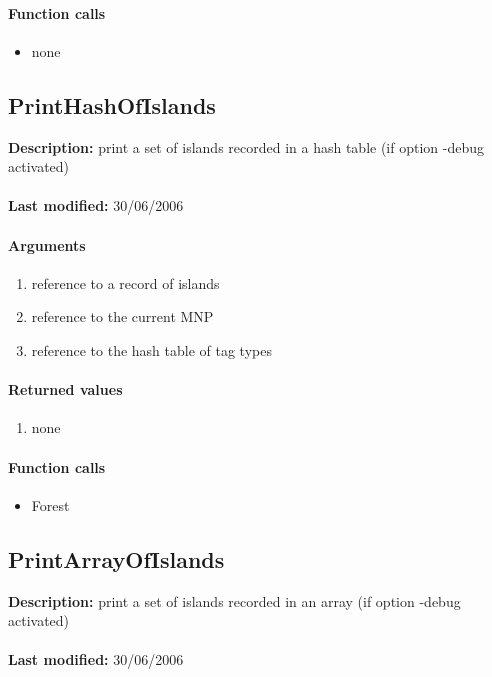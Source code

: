 \paragraph{Function calls}
\begin{itemize}
\item none
\end{itemize}

\subsection{PrintHashOfIslands}
\textbf{Description:} print a set of islands recorded in a hash table (if option -debug activated)\\
\\\textbf{Last modified:} 30/06/2006

\paragraph{Arguments}
\begin{enumerate}
\item reference to a record of islands
\item reference to the current MNP
\item reference to the hash table of tag types
\end{enumerate}

\paragraph{Returned values}
\begin{enumerate}
\item none
\end{enumerate}

\paragraph{Function calls}
\begin{itemize}
\item Forest
\end{itemize}

\subsection{PrintArrayOfIslands}
\textbf{Description:} print a set of islands recorded in an array (if option -debug activated)\\
\\\textbf{Last modified:} 30/06/2006

